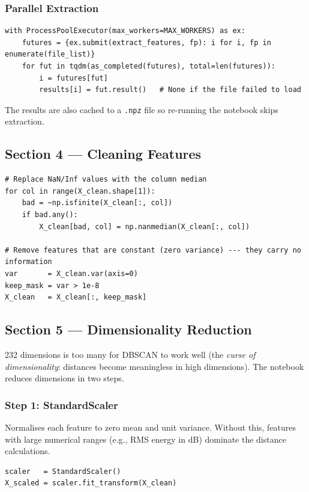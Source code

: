 \documentclass[12pt,a4paper]{article}
\begin{document}
\subsubsection{Parallel Extraction}

\begin{lstlisting}
with ProcessPoolExecutor(max_workers=MAX_WORKERS) as ex:
    futures = {ex.submit(extract_features, fp): i for i, fp in enumerate(file_list)}
    for fut in tqdm(as_completed(futures), total=len(futures)):
        i = futures[fut]
        results[i] = fut.result()   # None if the file failed to load
\end{lstlisting}

The results are also cached to a \texttt{.npz} file so re-running the notebook skips extraction.

\subsection{Section 4 --- Cleaning Features}

\begin{lstlisting}
# Replace NaN/Inf values with the column median
for col in range(X_clean.shape[1]):
    bad = ~np.isfinite(X_clean[:, col])
    if bad.any():
        X_clean[bad, col] = np.nanmedian(X_clean[:, col])

# Remove features that are constant (zero variance) --- they carry no information
var       = X_clean.var(axis=0)
keep_mask = var > 1e-8
X_clean   = X_clean[:, keep_mask]
\end{lstlisting}

\subsection{Section 5 --- Dimensionality Reduction}

232 dimensions is too many for DBSCAN to work well (the \textit{curse of dimensionality}: distances become meaningless in high dimensions). The notebook reduces dimensions in two steps.

\subsubsection{Step 1: StandardScaler}
Normalises each feature to zero mean and unit variance. Without this, features with large numerical ranges (e.g., RMS energy in dB) dominate the distance calculations.

\begin{lstlisting}
scaler   = StandardScaler()
X_scaled = scaler.fit_transform(X_clean)
\end{lstlisting}
\end{document}
